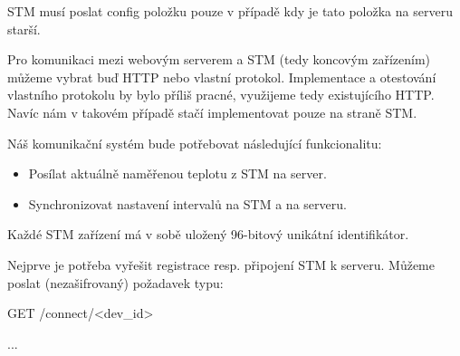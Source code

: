 STM musí poslat config položku pouze v případě kdy je tato položka na serveru starší.


Pro komunikaci mezi webovým serverem a STM (tedy koncovým zařízením) můžeme vybrat buď HTTP nebo vlastní protokol.
Implementace a otestování vlastního protokolu by bylo příliš pracné, využijeme tedy existujícího HTTP.
Navíc nám v takovém případě stačí implementovat pouze na straně STM.

Náš komunikační systém bude potřebovat následující funkcionalitu:
\begin{itemize}
    \item Posílat aktuálně naměřenou teplotu z STM na server.
    \item Synchronizovat nastavení intervalů na STM a na serveru.
\end{itemize}





Každé STM zařízení má v sobě uložený 96-bitový unikátní identifikátor.

Nejprve je potřeba vyřešit registrace resp. připojení STM k serveru.
Můžeme poslat (nezašifrovaný) požadavek typu:
\begin{code}
    GET /connect/<dev_id> 
\end{code}
...